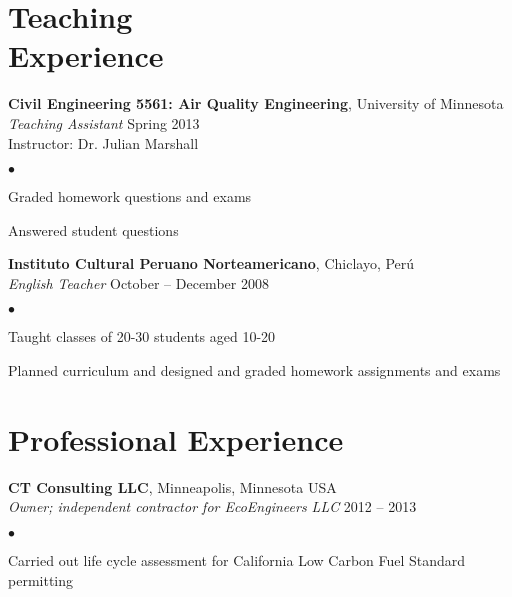 \documentclass[margin,line,10pt]{res}
\newenvironment{list2}{
  \begin{list}{$\bullet$}{%
      \setlength{\itemsep}{0in}
      \setlength{\parsep}{0in} \setlength{\parskip}{0in}
      \setlength{\topsep}{0in} \setlength{\partopsep}{0in} 
      \setlength{\leftmargin}{0.2in}}}{\end{list}}
\begin{document}
\begin{resume}





\section{\sc Teaching\\Experience}

{\bf Civil Engineering 5561: Air Quality Engineering}, University of Minnesota\\
{\em Teaching Assistant} \hfill Spring 2013\\
\vspace{-.3cm}
Instructor: Dr. Julian Marshall\\
\begin{list2}
\item Graded homework questions and exams
\item Answered student questions
\end{list2}

\vspace*{-.1in}

{\bf Instituto Cultural Peruano Norteamericano}, Chiclayo, Per\'{u}\\
\vspace{-.3cm}
{\em English Teacher} \hfill October -- December 2008\\
\begin{list2}
\item Taught classes of 20-30 students aged 10-20
\item Planned curriculum and designed and graded homework assignments and exams
\end{list2}


\section{\sc Professional Experience}

{\bf CT Consulting LLC}, Minneapolis, Minnesota USA\\
\vspace{-.3cm}
{\em Owner; independent contractor for EcoEngineers LLC} \hfill 2012 -- 2013\\
\begin{list2}
\item Carried out life cycle assessment for California Low Carbon Fuel Standard permitting
\end{list2}


\end{resume}
\end{document}
